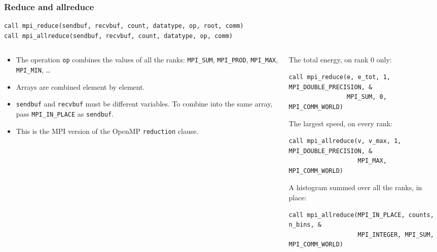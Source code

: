 \begin{frame}[fragile]
  \frametitle{Reduce and allreduce}
\begin{lstlisting}
call mpi_reduce(sendbuf, recvbuf, count, datatype, op, root, comm)
call mpi_allreduce(sendbuf, recvbuf, count, datatype, op, comm)
\end{lstlisting}
  \begin{columns}[T]
    \begin{column}{0.45\textwidth}
      \begin{itemize}
        \item The operation \texttt{op} combines the values of all the ranks: \texttt{MPI\_SUM}, \texttt{MPI\_PROD}, \texttt{MPI\_MAX}, \texttt{MPI\_MIN}, \ldots
        \item Arrays are combined element by element.
        \item \texttt{sendbuf} and \texttt{recvbuf} must be different variables. To combine into the same array, pass \texttt{MPI\_IN\_PLACE} as \texttt{sendbuf}.
        \item This is the MPI version of the OpenMP \texttt{reduction} clause.
      \end{itemize}
    \end{column}

    \begin{column}{0.55\textwidth}
      The total energy, on rank 0 only:
\begin{lstlisting}
call mpi_reduce(e, e_tot, 1, MPI_DOUBLE_PRECISION, &
                MPI_SUM, 0, MPI_COMM_WORLD)
\end{lstlisting}

      The largest speed, on every rank:
\begin{lstlisting}
call mpi_allreduce(v, v_max, 1, MPI_DOUBLE_PRECISION, &
                   MPI_MAX, MPI_COMM_WORLD)
\end{lstlisting}

      A histogram summed over all the ranks, in place:
\begin{lstlisting}
call mpi_allreduce(MPI_IN_PLACE, counts, n_bins, &
                   MPI_INTEGER, MPI_SUM, MPI_COMM_WORLD)
\end{lstlisting}
    \end{column}
  \end{columns}
\end{frame}


